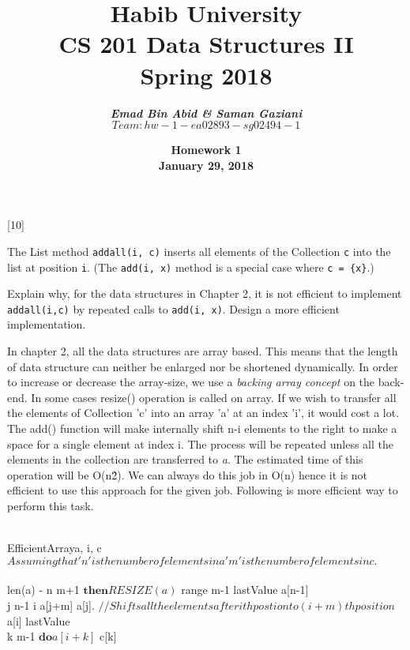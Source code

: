 \documentclass[addpoints]{exam}
\title{\textbf{Habib University}\\\textbf{CS 201 Data Structures II}\\\textbf{Spring 2018}}
\author{\textbf{\textit{Emad Bin Abid \& Saman Gaziani}}\\\textit{$Team: hw-1-ea02893-sg02494-1$}}
\date{\textbf{Homework 1}\\\textbf{January 29, 2018}}
\begin{document}
\maketitle

	\begin{questions}
	
	[10]
	
	The List method {\tt add\textunderscore all(i, c)} inserts all elements of the Collection {\tt c} into the list at position {\tt i}. (The {\tt add(i, x)} method is a special case where {\tt c = \{x\}}.)
	
	Explain why, for the data structures in Chapter 2, it is not efficient to implement {\tt add\textunderscore all(i,c)} by repeated calls to {\tt add(i, x)}. Design a more efficient implementation.
	\begin{solution}
		In chapter 2, all the data structures are array based. This means that the length of data structure can neither be enlarged nor be shortened dynamically. In order to increase or decrease the array-size, we use a \textit{backing array concept} on the back-end. In some cases resize() operation is called on array. If we wish to transfer all the elements of Collection 'c' into an array 'a' at an index 'i', it would cost a lot. The add() function will make internally shift n-i elements to the right to make a space for a single element at index i. The process will be repeated unless all the elements in the collection are transferred to \textit{a}. The estimated time of this operation will be O(n\^2). We can always do this job in O(n) hence it is not efficient to use this approach for the given job. Following is more efficient way to perform this task.\\ \\
		\begin{pseudocode}{EfficientArray}{a, i, c}
	  	\label{Array}
	  	\\
	  	$Assuming that 'n' is the number of elements in \textit{a} 'm' is the number of elements in \textit{c}.$\\ \\
		  	\IF len(a) - n \leq m+1 $ \textbf{then} RESIZE(a)$
		  	\ELSE
			  	\FOR range  \TO m-1 \DO 
				  	\BEGIN
					  	lastValue \GETS a[n-1]\\
					  	\FOR j \GETS n-1 \TO i \DO
						  	a[j+m] \GETS a[j]. $ //Shifts all the elements after ith postion to (i+m)th  position$\\	
					  	a[i] \GETS lastValue \\
					  	\FOR k  \TO m-1 $ \textbf{do} a[i+k]$ \GETS c[k]
				  	\END
		\ENDPROCEDURE
	  	\end{pseudocode}
	\end{solution}
	\pagebreak
	

\end{questions}
\end{document}
